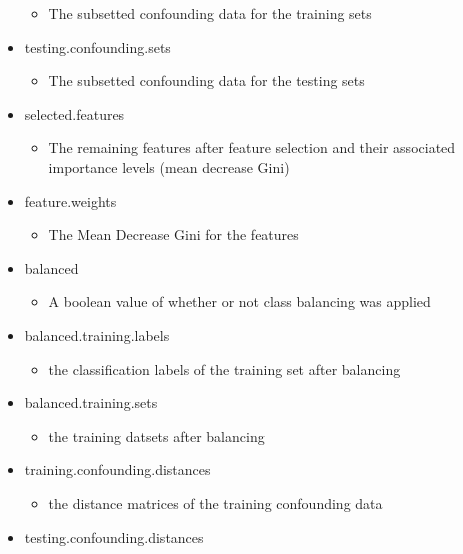\documentclass[
]{article}
\providecommand{\tightlist}{%
  \setlength{\itemsep}{0pt}\setlength{\parskip}{0pt}}
\begin{document}
\begin{itemize}
  \begin{itemize}
  \tightlist
  \item
    The subsetted confounding data for the training sets
  \end{itemize}
\item
  testing.confounding.sets

  \begin{itemize}
  \tightlist
  \item
    The subsetted confounding data for the testing sets
  \end{itemize}
\item
  selected.features

  \begin{itemize}
  \tightlist
  \item
    The remaining features after feature selection and their associated
    importance levels (mean decrease Gini)
  \end{itemize}
\item
  feature.weights

  \begin{itemize}
  \tightlist
  \item
    The Mean Decrease Gini for the features
  \end{itemize}
\item
  balanced

  \begin{itemize}
  \tightlist
  \item
    A boolean value of whether or not class balancing was applied
  \end{itemize}
\item
  balanced.training.labels

  \begin{itemize}
  \tightlist
  \item
    the classification labels of the training set after balancing
  \end{itemize}
\item
  balanced.training.sets

  \begin{itemize}
  \tightlist
  \item
    the training datsets after balancing
  \end{itemize}
\item
  training.confounding.distances

  \begin{itemize}
  \tightlist
  \item
    the distance matrices of the training confounding data
  \end{itemize}
\item
  testing.confounding.distances


\end{itemize}
\end{document}
